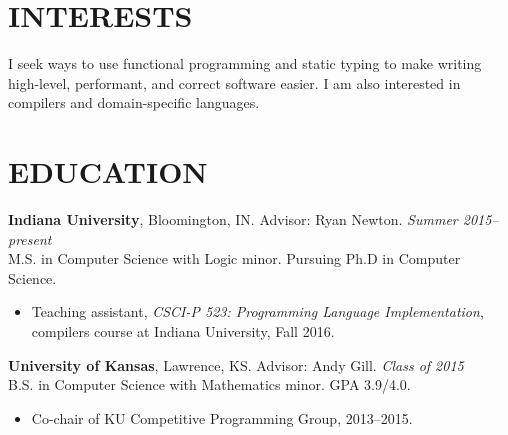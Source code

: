 \documentclass{res}
\begin{document}
\address{\texttt{rgscott@indiana.edu} $\bullet$ \texttt{ryanglscott.github.io}}

\begin{resume}

\section{INTERESTS}
    I seek ways to use functional programming and static typing to make writing high-level, performant, and correct software easier. I am also interested in compilers and domain-specific languages.

\section{EDUCATION}
     \textbf{Indiana University}, Bloomington, IN. Advisor: Ryan Newton. \hfill \textit{Summer 2015--present} \\
    M.S. in Computer Science with Logic minor. Pursuing Ph.D in Computer Science.
    \begin{itemize}
     \item Teaching assistant, \textit{CSCI-P 523: Programming Language Implementation}, compilers course at Indiana University, Fall 2016.
    \end{itemize}

     \textbf{University of Kansas}, Lawrence, KS. Advisor: Andy Gill. \hfill \textit{Class of 2015} \\
    B.S. in Computer Science with Mathematics minor. GPA 3.9/4.0.
    \begin{itemize}
     \item Co-chair of KU Competitive Programming Group, 2013--2015.
    \end{itemize}


\end{resume}
\end{document}
